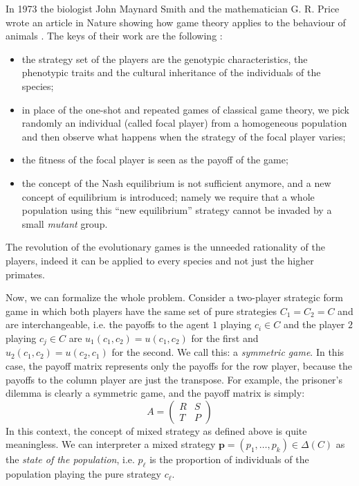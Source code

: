 In 1973 the biologist John Maynard Smith and the mathematician G.
R. Price wrote an article in Nature showing how game theory applies
to the behaviour of animals \cite{MaynardSmith1973}. The keys of
their work are the following \cite{gintis_game_2009}:
\begin{itemize}
\item the strategy set of the players are the genotypic characteristics,
the phenotypic traits and the cultural inheritance of the individuals
of the species;
\item in place of the one-shot and repeated games of classical game theory,
we pick randomly an individual (called focal player) from a homogeneous
population and then observe what happens when the strategy of the
focal player varies;
\item the fitness of the focal player is seen as the payoff of the game;
\item the concept of the Nash equilibrium is not sufficient anymore, and
a new concept of equilibrium is introduced; namely we require that
a whole population using this ``new equilibrium'' strategy cannot
be invaded by a small \textit{mutant} group.
\end{itemize}
The revolution of the evolutionary games is the unneeded rationality
of the players, indeed it can be applied to every species and not
just the higher primates.

Now, we can formalize the whole problem. Consider a two-player strategic
form game in which both players have the same set of pure strategies
$C_{1}=C_{2}=C$ and are interchangeable, i.e. the payoffs to the
agent $1$ playing $c_{i}\in C$ and the player $2$ playing $c_{j}\in C$
are $u_{1}\left(c_{1},c_{2}\right)=u\left(c_{1},c_{2}\right)$ for
the first and $u_{2}\left(c_{1},c_{2}\right)=u\left(c_{2},c_{1}\right)$
for the second. We call this: a \textit{symmetric game}. In this case,
the payoff matrix represents only the payoffs for the row player,
because the payoffs to the column player are just the transpose. For
example, the prisoner's dilemma is clearly a symmetric game, and the
payoff matrix is simply:
\[
A=\left(\begin{array}{cc}
R & S\\
T & P
\end{array}\right)
\]
 In this context, the concept of mixed strategy as defined above is
quite meaningless. We can interpreter a mixed strategy $\mathbf{p}=\left(p_{1},\ldots,p_{k}\right)\in\Delta\left(C\right)$
as the \textit{state of the population}, i.e. $p_{\ell}$ is the proportion
of individuals of the population playing the pure strategy $c_{\ell}$. 

